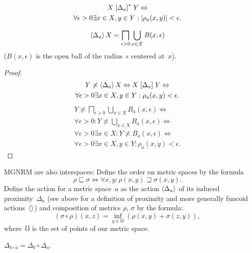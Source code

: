 \begin{obvious}
\begin{multline*}
X\mathrel{\left[\Delta_a\right]^{\ast}}Y \Leftrightarrow \\
\forall\epsilon>0\exists x\in X,y\in Y:
\lvert\rho_a(x,y)\rvert<\epsilon.
\end{multline*}
\end{obvious}

\begin{thm}
\[ \left\langle \Delta_a\right\rangle X = \bigsqcap_{\epsilon>0}\bigcup_{x\in X}B(x,\epsilon) \]
($B(x,\epsilon)$ is the open ball of the radius~$\epsilon$ centered at~$x$).
\end{thm}

\begin{proof}
\begin{multline*}
Y\not\asymp\left\langle \Delta_a\right\rangle X\Leftrightarrow X\mathrel{\left[\Delta_a\right]}Y \Leftrightarrow \\ \forall\epsilon>0\exists x\in X,y\in Y:\rho_a(x,y)<\epsilon.
\end{multline*}
\begin{multline*}
Y\nasymp\bigsqcap_{\epsilon>0}\bigcup_{x\in X}B_a(x,\epsilon) \Leftrightarrow \\ \forall\epsilon>0:Y\nasymp\bigcup_{x\in X}B_a(x,\epsilon) \Leftrightarrow \\
\forall\epsilon>0\exists x\in X:Y\nasymp B_a(x,\epsilon) \Leftrightarrow \\
\forall\epsilon>0\exists x\in X,y\in Y:\rho_a(x,y)<\epsilon.
\end{multline*}
\end{proof}

MGNRM are also interspaces: Define the order on metric spaces by the formula \[ \rho\sqsubseteq\sigma \Leftrightarrow \forall x,y:\rho(x,y)\sqsupseteq\sigma(x,y). \] Define the action for a metric space~$a$ as the action $\left\langle \Delta_a\right\rangle$ of its induced proximity~$\Delta_a$ (see above for a definition of proximity and more generally funcoid actions~$\left\langle \right\rangle$) and composition of metrics $\rho$, $\sigma$ by the formula: \[ (\sigma\circ\rho)(x,z) = \inf_{y\in\mho}(\rho(x,y)+\sigma(z,y)), \]
where~$\mho$ is the set of points of our metric space.

\begin{lem}
$\Delta_{b\circ a} = \Delta_b\circ\Delta_a$.
\end{lem}

